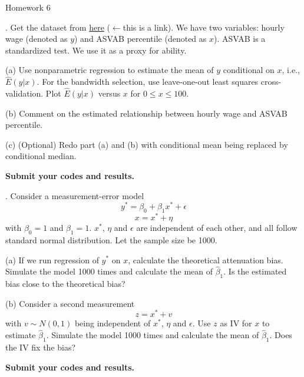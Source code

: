 \documentclass[12pt]{article}
\begin{document}
\begin{center}
Homework 6
\end{center}

\medskip

.  Get the dataset from \href{https://www.dropbox.com/s/2cyb1y87g3tk4ob/wage.xlsx?dl=0}{here} ($\leftarrow$this is a link). We have two variables: hourly wage (denoted as $y$) and ASVAB percentile (denoted as $x$). ASVAB is a standardized test. We use it as a proxy for ability. 

\medskip

(a) Use nonparametric regression to estimate the mean of $y$ conditional on $x$, i.e., $\hat E(y|x)$. For the bandwidth selection, use leave-one-out least squares cross-validation. Plot $\hat E(y|x)$ versus $x$ for $0\leq x\leq 100$.

\medskip

(b) Comment on the estimated relationship between hourly wage and ASVAB percentile.

\medskip

(c) (Optional) Redo part (a) and (b) with conditional mean being replaced by conditional median.

\medskip

\textbf{Submit your codes and results.}

\medskip

. Consider a measurement-error model
$$y^*=\beta_0+\beta_1 x^*+\epsilon$$
$$x=x^*+\eta$$
with $\beta_0=1$ and $\beta_1=1$.
$x^*$, $\eta$ and $\epsilon$ are independent of each other, and all follow standard normal distribution.
Let the sample size be 1000.

(a) If we run regression of $y^*$ on $x$, calculate the theoretical attenuation bias. Simulate the model 1000 times and calculate the mean of $\hat\beta_1$. Is the estimated bias close to the theoretical bias?

\medskip

(b) Consider a second measurement
$$z=x^*+v$$
with $v\sim N(0,1)$ being independent of $x^*$, $\eta$ and $\epsilon$. Use $z$ as IV for $x$ to estimate $\hat \beta_1$. Simulate the model 1000 times and calculate the mean of $\hat\beta_1$. Does the IV fix the bias?

\medskip

\textbf{Submit your codes and results.}
\end{document}
